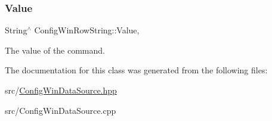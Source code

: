 \subsubsection{\texorpdfstring{Value}{Value}}
{\footnotesize\ttfamily String$^\wedge$ Config\+Win\+Row\+String\+::\+Value\hspace{0.3cm}{\ttfamily [get]}, {\ttfamily [set]}}



The value of the command. 



The documentation for this class was generated from the following files\+:\begin{DoxyCompactItemize}
\item 
src/\hyperlink{ConfigWinDataSource_8hpp}{Config\+Win\+Data\+Source.\+hpp}\item 
src/Config\+Win\+Data\+Source.\+cpp\end{DoxyCompactItemize}
